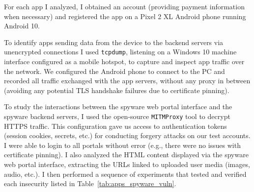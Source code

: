 For each app I analyzed, I obtained an account (providing payment
information when necessary) and registered the app on a Pixel 2 XL
Android phone running Android 10.

To identify apps sending data from the device to the backend servers via unencrypted connections I used \texttt{tcpdump},
listening on a Windows 10 machine interface configured as a mobile
hotspot, to capture and inspect app traffic over the network.  We
configured the Android phone to connect to the PC and recorded all
traffic exchanged with the app servers, without any proxy in between
(avoiding any potential TLS handshake failures due to certificate
pinning).

To study the interactions between the spyware web portal interface and
the spyware backend servers, I used the open-source \texttt{MITMProxy} tool to
decrypt HTTPS traffic.  This configuration gave us access to
authentication tokens (session cookies, secrets, etc.) for conducting
forgery attacks on our test accounts.  I were able to login to all
portals without error (e.g., there were no issues with certificate
pinning).  I also analyzed the HTML content displayed via the spyware
web portal interface, extracting the URLs linked to uploaded user
media (images, audio, etc.).  I then performed a sequence of
experiments that tested and verified each insecurity listed in
Table~\ref{tab:apps_spyware_vuln}.




